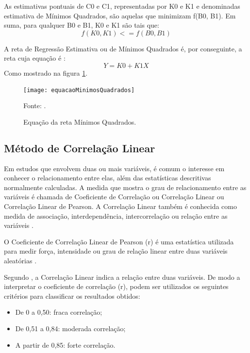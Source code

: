 As estimativas pontuais de C0 e C1, representadas por K0 e K1 e denominadas estimativa de Mínimos Quadrados, são aquelas que minimizam f(B0, B1). Em suma,  para qualquer B0 e B1, K0 e K1 são tais que:
\begin{equation}
f(K0,K1) <= f(B0,B1)
\end{equation}

A reta de Regressão Estimativa ou de Mínimos Quadrados é, por conseguinte, a reta cuja equação é :
\begin{equation}
Y = K0 + K1X 
\end{equation}
Como mostrado na figura \ref{equacaoMinimos}\cite[pág.~441]{devore2006}.

\graphicspath{{figuras/}}
\begin{figure}[htp]
\centering
\texttt{[image: equacaoMinimosQuadrados]}
\caption{Equação da reta Mínimos Quadrados.}{Fonte: .} 
\label{equacaoMinimos}
\end{figure}

\subsection{Método de Correlação Linear}

Em estudos que envolvem duas ou mais variáveis, é comum o interesse em conhecer o relacionamento entre elas, além das estatísticas descritivas normalmente calculadas. A medida que mostra o grau de relacionamento entre as variáveis é chamada de Coeficiente de Correlação ou Correlação Linear ou Correlação Linear de Pearson. A Correlação Linear também é conhecida como medida de associação, interdependência, intercorrelação ou relação entre as variáveis \cite[pág.~62]{lira2004}.

O Coeficiente de Correlação Linear de Pearson (r) é uma estatística utilizada para medir força, intensidade ou grau de relação linear entre duas variáveis aleatórias \cite[pág.~664]{ferreira2009}.

Segundo \cite[pág.~134]{lopes2005}, a Correlação Linear indica a relação entre duas variáveis. De modo a interpretar o coeficiente de correlação (r), podem ser utilizados os seguintes critérios para classificar os resultados obtidos:

\begin{itemize}
\item De 0 a 0,50: fraca correlação; 
\item De 0,51 a 0,84: moderada correlação;
\item A partir de 0,85: forte correlação.
\end{itemize}

